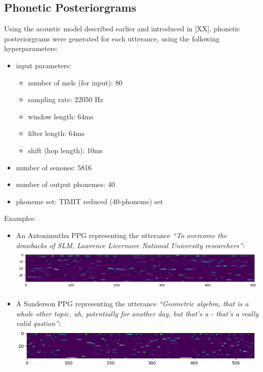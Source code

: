\subsection{Phonetic Posteriorgrams}
Using the acoustic model described earlier and introduced in [XX], phonetic posteriorgrams were generated 
for each utterance, using the following hyperparameters:
\begin{itemize}
  \item input parameters:
    \begin{itemize}
      \item number of mels (for input): 80
      \item sampling rate: 22050 Hz
      \item window length: 64ms
      \item filter length: 64ms
      \item shift (hop length): 10ms
    \end{itemize}
  \item number of senones: 5816
  \item number of output phonemes: 40
  \item phoneme set: TIMIT reduced (40-phoneme) set
\end{itemize}

Examples:
\begin{itemize}
\item An Antonimuthu PPG representing the utterance \textit{``To overcome the drawbacks of SLM, 
Lawrence Livermore National University researchers''}:\\
\includegraphics[width=\textwidth]{img/ppg_ant.png}
\item A Sanderson PPG representing the utterance \textit{``Geometric algebra, that is a whole other topic, uh, 
potentially for another day, but that's a - that's a really valid qustion''}:\\
\includegraphics[width=\textwidth]{img/ppg_san.png}
\end{itemize}